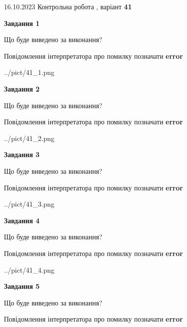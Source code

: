 \documentclass[12pt, ukrainian]{article}
\begin{document}
{\Large{16.10.2023 Контрольна робота , варіант  \No \textbf { 41 }\par}}
{
\begin {large}
{\begin {center}\textbf{Завдання 1}\end {center}}\par
Що буде виведено за виконання? \par
Повідомлення інтерпретатора про помилку позначати \textbf{error}

\begin{center}
	{../pict/41_1.png}
\end{center}
\newpage

{\begin {center}\textbf{Завдання 2}\end {center}}\par
Що буде виведено за виконання? \par
Повідомлення інтерпретатора про помилку позначати \textbf{error}

\begin{center}
	{../pict/41_2.png}
\end{center}
\newpage

{\begin {center}\textbf{Завдання 3}\end {center}}\par
Що буде виведено за виконання? \par
Повідомлення інтерпретатора про помилку позначати \textbf{error}

\begin{center}
	{../pict/41_3.png}
\end{center}
\newpage

{\begin {center}\textbf{Завдання 4}\end {center}}\par
Що буде виведено за виконання? \par
Повідомлення інтерпретатора про помилку позначати \textbf{error}

\begin{center}
	{../pict/41_4.png}
\end{center}
\newpage

{\begin {center}\textbf{Завдання 5}\end {center}}\par
Що буде виведено за виконання? \par
Повідомлення інтерпретатора про помилку позначати \textbf{error}


\end{large}}
\end{document}

